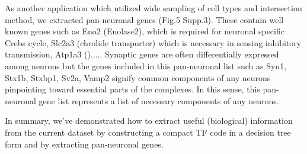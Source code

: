 As another application which utilized wide sampling of cell types and intersection method, we  extracted pan-neuronal genes (Fig.5 Supp.3). These contain well known genes such as Eno2 (Enolase2), which is required for neuronal specific Crebs cycle, Slc2a3 (chrolide transporter) which is necessary in sensing inhibitory transmission, Atp1a3 ().....  Synaptic genes are often differentially expressed among neurons but the genes included in this pan-neuronal list such as Syn1, Stx1b, Stxbp1, Sv2a, Vamp2 signify common components of any neurons pinpointing toward essential parts of the complexes. In this sense, this pan-neuronal gene list represents a list of necessary components of any neurons.

In summary, we've demonstrated how to extract useful (biological) information from the current dataset by constructing a compact TF code in a decision tree form and by extracting pan-neuronal genes.
